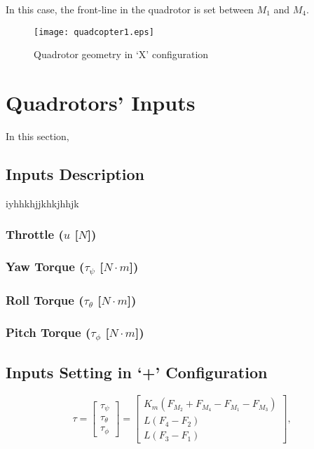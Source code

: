 In this case, the front-line in the quadrotor is set between $M_1$ and $M_4$.

\begin{figure}[H]
\begin{center}
  \texttt{[image: quadcopter1.eps]}
\caption{Quadrotor geometry in `X' configuration} 
    \label{fig:quadrotorX}
    \end{center}
\end{figure}


\section{Quadrotors' Inputs}
\label{sec:inputs}
In this section, 

\subsection{Inputs Description}
iyhhkhjjkhkjhhjk

\subsubsection{Throttle ($u$ [$N$])}

\subsubsection{Yaw Torque ($\tau_{\psi}$ [$N\cdot m$])}

\subsubsection{Roll Torque ($\tau_{\theta}$ [$N\cdot m$])}

\subsubsection{Pitch Torque ($\tau_{\phi}$ [$N\cdot m$])}

\subsection{Inputs Setting in `+' Configuration}
\begin{equation}
	\tau = \begin{bmatrix}
	\tau_{\psi}\\[5pt]
	\tau_{\theta}\\[5pt]
	\tau_{\phi}
	\end{bmatrix} = \begin{bmatrix}
								K_{m}(F_{M_2} + F_{M_4} - F_{M_1} - F_{M_3})\\[5pt]
								L(F_{4}-F_{2})\\[5pt]
								L(F_{3}-F_{1})
							\end{bmatrix},
	\label{ec:torques2}						
\end{equation}
